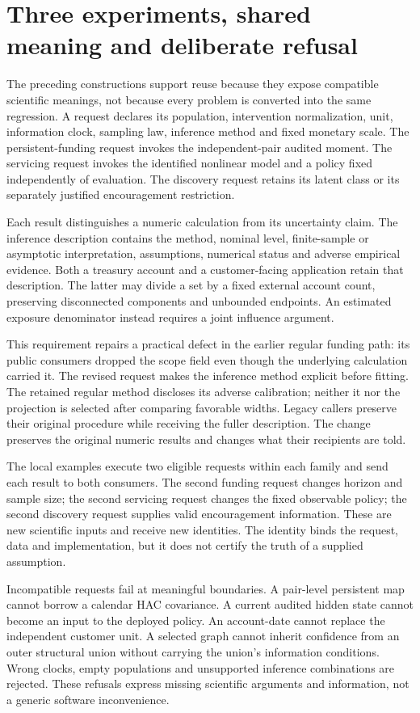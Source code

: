 \section{Three experiments, shared meaning and deliberate refusal}
\label{c7:journeys}
The preceding constructions support reuse because they expose compatible
scientific meanings, not because every problem is converted into the same
regression. A request declares its population, intervention normalization,
unit, information clock, sampling law, inference method and fixed monetary
scale. The persistent-funding request invokes the independent-pair audited
moment. The servicing request invokes the identified nonlinear model and a
policy fixed independently of evaluation. The discovery request retains its
latent class or its separately justified encouragement restriction.

Each result distinguishes a numeric calculation from its uncertainty claim.
The inference description contains the method, nominal level, finite-sample
or asymptotic interpretation, assumptions, numerical status and adverse
empirical evidence. Both a treasury account and a customer-facing application
retain that description. The latter may divide a set by a fixed external
account count, preserving disconnected components and unbounded endpoints.
An estimated exposure denominator instead requires a joint influence argument.

This requirement repairs a practical defect in the earlier regular funding
path: its public consumers dropped the scope field even though the underlying
calculation carried it. The revised request makes the inference method explicit
before fitting. The retained regular method discloses its adverse calibration;
neither it nor the projection is selected after comparing favorable widths.
Legacy callers preserve their original procedure while receiving the fuller
description. The change preserves the original numeric results and changes
what their recipients are told.

The local examples execute two eligible requests within each family and send
each result to both consumers. The second funding request changes horizon and
sample size; the second servicing request changes the fixed observable policy;
the second discovery request supplies valid encouragement information. These
are new scientific inputs and receive new identities. The identity binds the
request, data and implementation, but it does not certify the truth of a
supplied assumption.

Incompatible requests fail at meaningful boundaries. A pair-level persistent
map cannot borrow a calendar HAC covariance. A current audited hidden state
cannot become an input to the deployed policy. An account-date cannot replace
the independent customer unit. A selected graph cannot inherit confidence from
an outer structural union without carrying the union's information conditions.
Wrong clocks, empty populations and unsupported inference combinations are
rejected. These refusals express missing scientific arguments and information,
not a generic software inconvenience.

